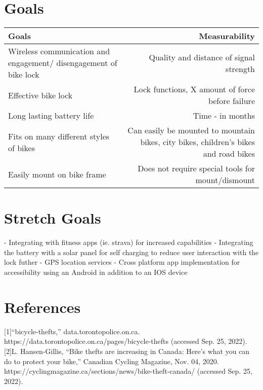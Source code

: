 \documentclass{article}
\begin{document}
\section{Goals}
\begin{table}[hG]
  \begin{center}
    \begin{tabular}{l|r}
      \textbf{Goals} & \textbf{Measurability}\\
      \hline
      Wireless communication and engagement/ disengagement of bike lock  & Quality and distance of signal strength\\
      Effective bike lock  & Lock functions, X amount of force before failure\\
      Long lasting battery life  & Time - in months \\
      Fits on many different styles of bikes & Can easily be mounted to mountain bikes, city bikes, children's bikes and road bikes \\
      Easily mount on bike frame & Does not require special tools for mount/dismount\\
    \end{tabular}
  \end{center}
\end{table}

\section{Stretch Goals}
  - Integrating with fitness apps (ie. strava) for increased capabilities
  - Integrating the battery with a solar panel for self charging to reduce user interaction with the lock futher
  - GPS location services
  - Cross platform app implementation for accessibility using an Android in addition to an IOS device
\section{References}

[1]“bicycle-thefts,” data.torontopolice.on.ca. https://data.torontopolice.on.ca/pages/bicycle-thefts (accessed Sep. 25, 2022).
[2]L. Hansen-Gillis, “Bike thefts are increasing in Canada: Here’s what you can do to protect your bike,” Canadian Cycling Magazine, Nov. 04, 2020. https://cyclingmagazine.ca/sections/news/bike-theft-canada/ (accessed Sep. 25, 2022).
‌
‌
\end{document}
